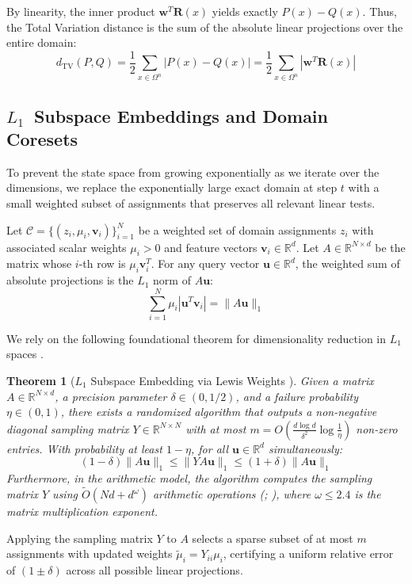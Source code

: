 \documentclass{article}
\newtheorem{theorem}{Theorem}[section]
\begin{document}
By linearity, the inner product $\mathbf{w}^T \mathbf{R}(x)$ yields exactly $P(x) - Q(x)$. Thus, the Total Variation distance is the sum of the absolute linear projections over the entire domain:
\begin{equation}
    d_{\mathrm{TV}}(P, Q) = \frac{1}{2} \sum_{x \in \Omega^n} \left| P(x) - Q(x) \right| = \frac{1}{2} \sum_{x \in \Omega^n} \left| \mathbf{w}^T \mathbf{R}(x) \right|
\end{equation}

\subsection{\texorpdfstring{$L_1$}\ ~Subspace Embeddings and Domain Coresets}

To prevent the state space from growing exponentially as we iterate over the dimensions, we replace the exponentially large exact domain at step $t$ with a small weighted subset of assignments that preserves all relevant linear tests.

Let $\mathcal{C} = \{(z_i, \mu_i, \mathbf{v}_i)\}_{i=1}^N$ be a weighted set of domain assignments $z_i$ with associated scalar weights $\mu_i > 0$ and feature vectors $\mathbf{v}_i \in \mathbb{R}^d$. Let $A \in \mathbb{R}^{N \times d}$ be the matrix whose $i$-th row is $\mu_i \mathbf{v}_i^T$. For any query vector $\mathbf{u} \in \mathbb{R}^d$, the weighted sum of absolute projections is the $L_1$ norm of $A\mathbf{u}$:
\begin{equation}
    \sum_{i=1}^N \mu_i |\mathbf{u}^T \mathbf{v}_i| = \|A\mathbf{u}\|_1
\end{equation}

We rely on the following foundational theorem for dimensionality reduction in $L_1$ spaces \cite{cohen2015lp}.
\begin{theorem}[$L_1$ Subspace Embedding via Lewis Weights \cite{cohen2015lp}]
\label{thm:lewis_weights}
Given a matrix $A \in \mathbb{R}^{N \times d}$, a precision parameter $\delta \in (0, 1/2)$, and a failure probability $\eta \in (0, 1)$, there exists a randomized algorithm that outputs a non-negative diagonal sampling matrix $Y \in \mathbb{R}^{N \times N}$ with at most $m = O\left( \frac{d \log d}{\delta^2} \log\frac{1}{\eta} \right)$ non-zero entries. With probability at least $1 - \eta$, for all $\mathbf{u} \in \mathbb{R}^d$ simultaneously:
\begin{equation}
    (1-\delta) \|A\mathbf{u}\|_1 \le \|YA\mathbf{u}\|_1 \le (1+\delta) \|A\mathbf{u}\|_1
\end{equation}
Furthermore, in the arithmetic model, the algorithm computes the sampling matrix $Y$ using $\widetilde{O}(Nd + d^\omega)$ arithmetic operations (\cite[Theorem 5.3.1]{lee2016faster}; \cite[Lemma 2.5]{jambulapati2022improved}), where $\omega \leq 2.4$ is the matrix multiplication exponent.
\end{theorem}
Applying the sampling matrix $Y$ to $A$ selects a sparse subset of at most $m$ assignments with updated weights $\tilde{\mu}_i = Y_{ii} \mu_i$, certifying a uniform relative error of $(1 \pm \delta)$ across all possible linear projections.
\end{document}

